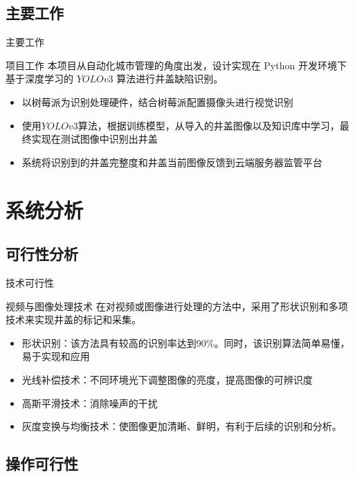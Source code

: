 \documentclass{beamer}
\begin{document}
\subsection{主要工作}
\begin{frame}{主要工作}
\begin{block}{项目工作}
    本项目从自动化城市管理的角度出发，设计实现在 Python 开发环境下基于深度学习的 $YOLOv3$ 算法进行井盖缺陷识别。
    \end{block}
    \begin{itemize}[<+-| alert@+>]
    \item 以树莓派为识别处理硬件，结合树莓派配置摄像头进行视觉识别
    \item 使用$YOLOv3$算法，根据训练模型，从导入的井盖图像以及知识库中学习，最终实现在测试图像中识别出井盖
    \item 系统将识别到的井盖完整度和井盖当前图像反馈到云端服务器监管平台
    \end{itemize}
\end{frame}

\section{系统分析}

\subsection{可行性分析}

\begin{frame}{技术可行性}
\begin{block}{视频与图像处理技术}
在对视频或图像进行处理的方法中，采用了形状识别和多项技术来实现井盖的标记和采集。
 \end{block}
    \begin{itemize}[<+-| alert@+>]
        \item 形状识别：该方法具有较高的识别率达到90\%。同时，该识别算法简单易懂，易于实现和应用
        \item 光线补偿技术：不同环境光下调整图像的亮度，提高图像的可辨识度
        \item 高斯平滑技术：消除噪声的干扰
        \item 灰度变换与均衡技术：使图像更加清晰、鲜明，有利于后续的识别和分析。
    \end{itemize}
\end{frame}

\subsection{操作可行性}
\end{document}
